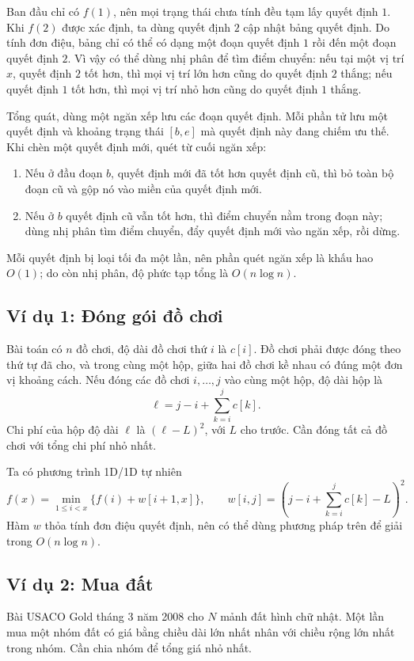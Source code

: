 \documentclass[11pt]{article}
\begin{document}
Ban đầu chỉ có $f(1)$, nên mọi trạng thái chưa tính đều tạm lấy quyết định
$1$. Khi $f(2)$ được xác định, ta dùng quyết định $2$ cập nhật bảng quyết
định. Do tính đơn điệu, bảng chỉ có thể có dạng một đoạn quyết định $1$ rồi
đến một đoạn quyết định $2$. Vì vậy có thể dùng nhị phân để tìm điểm chuyển:
nếu tại một vị trí $x$, quyết định $2$ tốt hơn, thì mọi vị trí lớn hơn cũng
do quyết định $2$ thắng; nếu quyết định $1$ tốt hơn, thì mọi vị trí nhỏ hơn
cũng do quyết định $1$ thắng.

Tổng quát, dùng một ngăn xếp lưu các đoạn quyết định. Mỗi phần tử lưu một
quyết định và khoảng trạng thái $[b,e]$ mà quyết định này đang chiếm ưu thế.
Khi chèn một quyết định mới, quét từ cuối ngăn xếp:
\begin{enumerate}
  \item Nếu ở đầu đoạn $b$, quyết định mới đã tốt hơn quyết định cũ, thì bỏ
  toàn bộ đoạn cũ và gộp nó vào miền của quyết định mới.
  \item Nếu ở $b$ quyết định cũ vẫn tốt hơn, thì điểm chuyển nằm trong đoạn
  này; dùng nhị phân tìm điểm chuyển, đẩy quyết định mới vào ngăn xếp, rồi
  dừng.
\end{enumerate}
Mỗi quyết định bị loại tối đa một lần, nên phần quét ngăn xếp là khấu hao
$O(1)$; do còn nhị phân, độ phức tạp tổng là $O(n\log n)$.

\subsection{Ví dụ 1: Đóng gói đồ chơi}

Bài toán có $n$ đồ chơi, độ dài đồ chơi thứ $i$ là $c[i]$. Đồ chơi phải được
đóng theo thứ tự đã cho, và trong cùng một hộp, giữa hai đồ chơi kề nhau có
đúng một đơn vị khoảng cách. Nếu đóng các đồ chơi $i,\ldots,j$ vào cùng một
hộp, độ dài hộp là
\[
  \ell=j-i+\sum_{k=i}^{j}c[k].
\]
Chi phí của hộp độ dài $\ell$ là $(\ell-L)^2$, với $L$ cho trước. Cần đóng
tất cả đồ chơi với tổng chi phí nhỏ nhất.

Ta có phương trình 1D/1D tự nhiên
\[
  f(x)=\min_{1\le i<x}\{f(i)+w[i+1,x]\},
  \qquad
  w[i,j]=\left(j-i+\sum_{k=i}^{j}c[k]-L\right)^2.
\]
Hàm $w$ thỏa tính đơn điệu quyết định, nên có thể dùng phương pháp trên để
giải trong $O(n\log n)$.

\subsection{Ví dụ 2: Mua đất}

Bài USACO Gold tháng 3 năm 2008 cho $N$ mảnh đất hình chữ nhật. Một lần mua
một nhóm đất có giá bằng chiều dài lớn nhất nhân với chiều rộng lớn nhất
trong nhóm. Cần chia nhóm để tổng giá nhỏ nhất.
\end{document}
